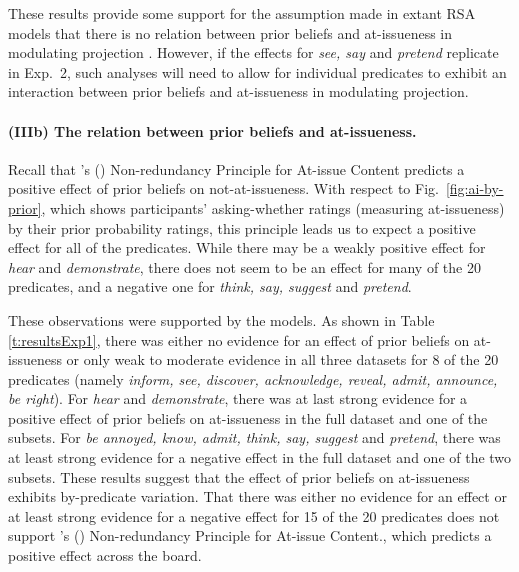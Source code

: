 \documentclass[11pt,fleqn]{article}
\newcommand{\6}{\mbox{$[\hspace*{-.6mm}[$}}
\newcommand{\9}{\mbox{$]\hspace*{-.6mm}]$}}
\newcommand{\citetpos}[1]{\citeauthor{#1}'s (\citeyear{#1})}
\begin{document}
These results provide some support for the assumption made in extant RSA models that there is no relation between prior beliefs and at-issueness in modulating projection \citep{qing-etal2016,stevens-etal2017,warstadt2022,pan-degen2023,scontras-tonhauser2025}. However, if the effects for {\em see, say} and {\em pretend} replicate in Exp.~2, such analyses will need to allow for individual predicates to exhibit an interaction between prior beliefs and at-issueness in modulating projection.

\paragraph{(IIIb) The relation between prior beliefs and at-issueness.} 

Recall that \citetpos{tonhauser-etal-eval} Non-redundancy Principle for At-issue Content predicts a positive effect of prior beliefs on not-at-issueness. With respect to Fig.~\ref{fig:ai-by-prior}, which shows participants' asking-whether ratings (measuring at-issueness) by their prior probability ratings, this principle leads us to expect a positive effect for all of the predicates. While there may be a weakly positive effect for {\em hear} and {\em demonstrate}, there does not seem to be an effect for many of the 20 predicates, and a negative one for {\em think, say, suggest} and {\em pretend}.

These observations were supported by the models. As shown in Table \ref{t:resultsExp1}, there was either no evidence for an effect of prior beliefs on at-issueness or only weak to moderate evidence in all three datasets for 8 of the 20 predicates (namely {\em inform, see, discover, acknowledge, reveal, admit, announce, be right}). For {\em hear} and {\em demonstrate}, there was at last strong evidence for a positive effect of prior beliefs on at-issueness in the full dataset and one of the subsets. For {\em be annoyed, know, admit, think, say, suggest} and {\em pretend}, there was at least strong evidence for a negative effect in the full dataset and one of the two subsets. These results suggest that the effect of prior beliefs on at-issueness exhibits by-predicate variation. That there was either no evidence for an effect or at least strong evidence for a negative effect for 15 of the 20 predicates does not support \citetpos{tonhauser-etal-eval} Non-redundancy Principle for At-issue Content., which predicts a positive effect across the board.


\setlength{\fboxrule}{0pt}
\end{document}
